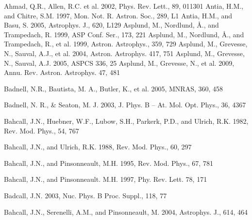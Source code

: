 \documentclass[11pt, double, phd]{osudiss-2}
\begin{document}
\begin {thebibliography} {}
 Ahmad, Q.R., Allen, R.C. et al. 2002, Phys. Rev. Lett., 89, 011301
 Antia, H.M., and Chitre, S.M. 1997, Mon. Not. R. Astron. Soc., 289, L1
 Antia, H.M., and Basu, S. 2005, Astrophys. J., 620, L129
 Asplund, M., Nordlund, \AA., and Trampedach, R. 1999, ASP Conf. Ser., 173, 221
 Asplund, M., Nordlund, \AA., and Trampedach, R., et al. 1999, Astron. Astrophys., 359, 729
 Asplund, M., Grevesse, N., Sauval, A.J., et al. 2004, Astron. Astrophys. 417, 751
 Asplund, M., Grevesse, N., Sauval, A.J. 2005, ASPCS 336, 25
 Asplund, M., Grevesse, N., et al. 2009, Annu. Rev. Astron. Astrophys. 47, 481

 Badnell, N.R., Bautista, M. A., Butler, K., et al. 2005, MNRAS, 360, 458

 Badnell, N. R., \& Seaton, M. J. 2003, J. Phys. B -- At. Mol. Opt. Phys., 36, 4367

 Bahcall, J.N., Huebner, W.F., Lubow, S.H., Parkerk, P.D., and Ulrich, R.K. 1982, Rev. Mod. Phys., 54, 767

 Bahcall, J.N., and Ulrich, R.K. 1988, Rev. Mod. Phys., 60, 297

 Bahcall, J.N., and Pinsonneault, M.H. 1995, Rev. Mod. Phys., 67, 781

 Bahcall, J.N., and Pinsonneault. M.H. 1997, Phy. Rev. Lett. 78, 171

 Badcall, J.N. 2003, Nuc. Phys. B Proc. Suppl., 118, 77

 Bahcall, J.N., Serenelli, A.M., and Pinsonneault, M. 2004, Astrophys. J., 614, 464


\end{thebibliography}
\end{document}
